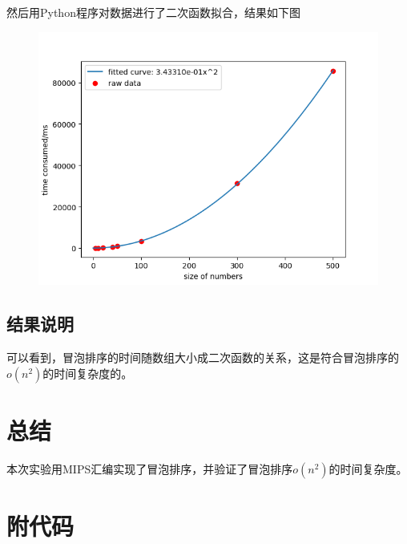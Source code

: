\documentclass[UTF8]{article}
\begin{document}
然后用Python程序对数据进行了二次函数拟合，结果如下图
\begin{figure}[H]
	\centering
	\includegraphics[scale=0.6]{test_diagram.png}
\end{figure}\par
\subsection{结果说明}
可以看到，冒泡排序的时间随数组大小成二次函数的关系，这是符合冒泡排序的$o(n^2)$的时间复杂度的。

\section{总结}
本次实验用MIPS汇编实现了冒泡排序，并验证了冒泡排序$o(n^2)$的时间复杂度。

\section{附代码}

\end{document}
